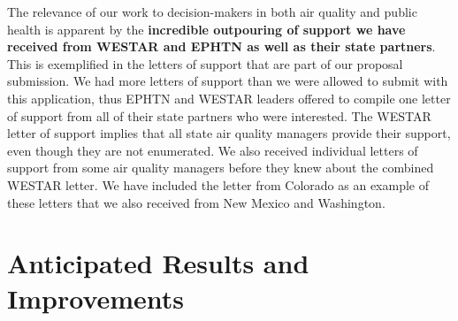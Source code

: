 \documentclass[authoryear]{elsarticle}
\begin{document}
The relevance of our work to decision-makers in both air quality and public health is apparent by the \textbf{incredible outpouring of support we have received from WESTAR and EPHTN as well as their state partners}. This is exemplified in the letters of support that are part of our proposal submission. We had more letters of support than we were allowed to submit with this application, thus EPHTN and WESTAR leaders offered to compile one letter of support from all of their state partners who were interested. The WESTAR letter of support implies that all state air quality managers provide their support, even though they are not enumerated. We also received individual letters of support from some air quality managers before they knew about the combined WESTAR letter. We have included the letter from Colorado as an example of these letters that we also received from New Mexico and Washington. 

\section{Anticipated Results and Improvements}
\end{document}
